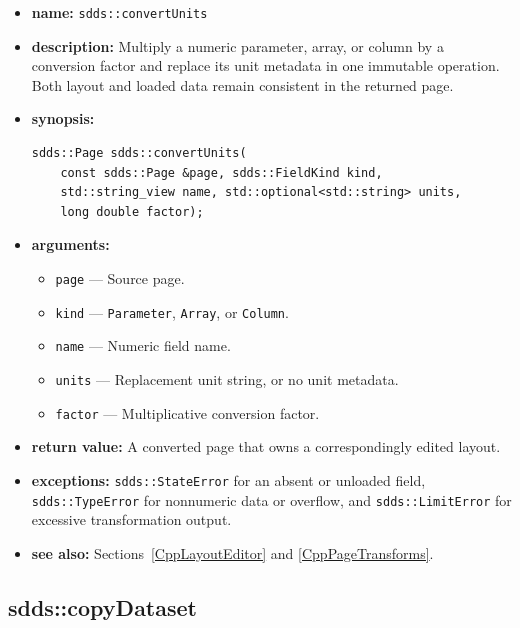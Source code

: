 \documentclass[11pt]{article}
\begin{document}
\begin{itemize}
\item {\bf name:}\newline
{\tt sdds::convertUnits}
\item {\bf description:}\newline
Multiply a numeric parameter, array, or column by a conversion factor and
replace its unit metadata in one immutable operation.  Both layout and loaded
data remain consistent in the returned page.
\item {\bf synopsis:}
\begin{verbatim}
sdds::Page sdds::convertUnits(
    const sdds::Page &page, sdds::FieldKind kind,
    std::string_view name, std::optional<std::string> units,
    long double factor);
\end{verbatim}
\item {\bf arguments:}
\begin{itemize}
\item {\tt page} --- Source page.
\item {\tt kind} --- {\tt Parameter}, {\tt Array}, or {\tt Column}.
\item {\tt name} --- Numeric field name.
\item {\tt units} --- Replacement unit string, or no unit metadata.
\item {\tt factor} --- Multiplicative conversion factor.
\end{itemize}
\item {\bf return value:}\newline
A converted page that owns a correspondingly edited layout.
\item {\bf exceptions:}\newline
{\tt sdds::StateError} for an absent or unloaded field,
{\tt sdds::TypeError} for nonnumeric data or overflow, and
{\tt sdds::LimitError} for excessive transformation output.
\item {\bf see also:}\newline
Sections~\ref{CppLayoutEditor} and \ref{CppPageTransforms}.
\end{itemize}

\subsection{sdds::copyDataset}
\label{CppCopyDataset}
\end{document}
